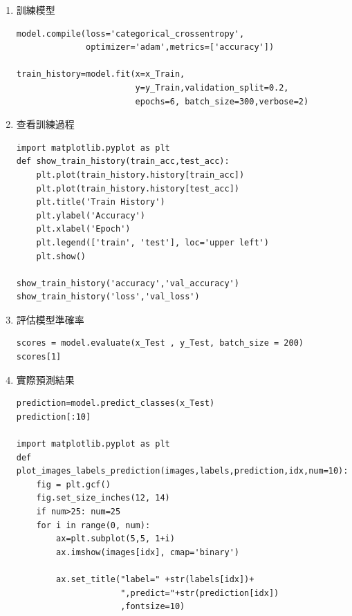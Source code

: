 \documentclass[a4paper,12pt]{article}
\begin{document}
\begin{enumerate}
\item 訓練模型
\label{sec:org45e5efd}
\lstset{breaklines=true,language=Python,label= ,caption= ,captionpos=b,numbers=none}
\begin{lstlisting}
model.compile(loss='categorical_crossentropy',
              optimizer='adam',metrics=['accuracy'])

train_history=model.fit(x=x_Train,
                        y=y_Train,validation_split=0.2,
                        epochs=6, batch_size=300,verbose=2)
\end{lstlisting}

\item 查看訓練過程
\label{sec:orgb6feed2}
\lstset{breaklines=true,language=Python,label= ,caption= ,captionpos=b,numbers=none}
\begin{lstlisting}
import matplotlib.pyplot as plt
def show_train_history(train_acc,test_acc):
    plt.plot(train_history.history[train_acc])
    plt.plot(train_history.history[test_acc])
    plt.title('Train History')
    plt.ylabel('Accuracy')
    plt.xlabel('Epoch')
    plt.legend(['train', 'test'], loc='upper left')
    plt.show()

show_train_history('accuracy','val_accuracy')
show_train_history('loss','val_loss')
\end{lstlisting}

\item 評估模型準確率
\label{sec:org1541fec}
\lstset{breaklines=true,language=Python,label= ,caption= ,captionpos=b,numbers=none}
\begin{lstlisting}
scores = model.evaluate(x_Test , y_Test, batch_size = 200)
scores[1]
\end{lstlisting}

\item 實際預測結果
\label{sec:org26cf554}
\lstset{breaklines=true,language=Python,label= ,caption= ,captionpos=b,numbers=none}
\begin{lstlisting}
prediction=model.predict_classes(x_Test)
prediction[:10]

import matplotlib.pyplot as plt
def plot_images_labels_prediction(images,labels,prediction,idx,num=10):
    fig = plt.gcf()
    fig.set_size_inches(12, 14)
    if num>25: num=25
    for i in range(0, num):
        ax=plt.subplot(5,5, 1+i)
        ax.imshow(images[idx], cmap='binary')

        ax.set_title("label=" +str(labels[idx])+
                     ",predict="+str(prediction[idx])
                     ,fontsize=10)


\end{lstlisting}
\end{enumerate}
\end{document}
